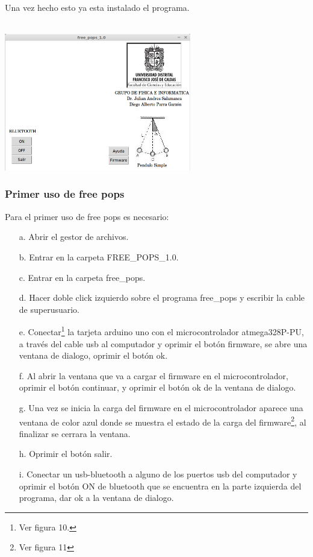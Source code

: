\documentclass[12pt]{article}
\newenvironment{Figure}
{\par\medskip\noindent\minipage{\linewidth}}
{\endminipage\par\medskip}
\begin{document}
\begin{multicols}{2}
\begin{enumerate}
\end{enumerate}
Una vez hecho esto ya esta instalado el programa. 
\\ \\
\begin{Figure}
\center
\includegraphics[width=8.cm, height=6cm]{fig/Docu1.png}
\label{fig:g10}
\end{Figure}
\vspace{0.2cm}

\subsubsection{Primer uso de free pops}
Para el primer uso de free pops es necesario:
\begin{enumerate}
\item[a. ] Abrir el gestor de archivos.
\item[b. ] Entrar en la carpeta FREE\_POPS\_1.0.
\item[c. ] Entrar en la carpeta free\_pops.
\item[d. ] Hacer doble click izquierdo sobre el programa free\_pops y escribir la cable de superusuario.
\item[e. ] Conectar\footnote{ Ver figura 10.} la tarjeta arduino uno con el microcontrolador atmega328P-PU, a través del cable usb al computador y oprimir el botón firmware, se abre una ventana de dialogo, oprimir el botón ok. 
\item[f. ] Al abrir la ventana que va a cargar el firmware en el microcontrolador, oprimir el botón continuar, y oprimir el botón ok de la  ventana de dialogo.
\item[g. ] Una vez se inicia la carga del firmware en el microcontrolador aparece una ventana de color azul donde se muestra el estado de la carga del firmware\footnote{ Ver figura 11}, al finalizar se cerrara la ventana.
\item[h. ] Oprimir el botón salir.
\item[i. ] Conectar un usb-bluetooth a alguno de los puertos usb del computador y oprimir el botón ON de bluetooth que se encuentra en la parte izquierda del programa, dar ok a la ventana de dialogo.
\end{enumerate}
\vspace{0.2cm}



\end{multicols}
\end{document}
